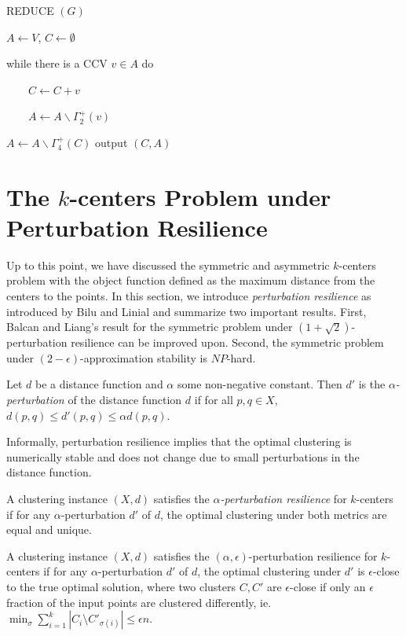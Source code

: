 \begin{algorithm}
\caption{REDUCE $(G)$}
$A \leftarrow V$, $C \leftarrow \emptyset$

while there is a CCV $v \in A$ do

\ \ \ \ $C \leftarrow C + v$

\ \ \ \ $A \leftarrow A \backslash \Gamma^+_2(v)$

$A \leftarrow A \backslash \Gamma^+_4(C)$
output $(C,A)$
\end{algorithm}

\section{The $k$-centers Problem under Perturbation Resilience}

Up to this point, we have discussed the symmetric and asymmetric $k$-centers problem with the object function defined as the maximum distance from the centers to the points. In this section, we introduce \emph{perturbation resilience} as introduced by Bilu and Linial and summarize two important results. First, Balcan and Liang's result for the symmetric problem under $(1+\sqrt2)$-perturbation resilience can be improved upon. Second, the symmetric problem under $(2-\epsilon)$-approximation stability is $NP$-hard.

\begin{definition}
Let $d$ be a distance function and $\alpha$ some non-negative constant. Then $d'$ is the \emph{$\alpha$-perturbation} of the distance function $d$ if for all $p,q\in X$, $d(p,q)\leq d'(p,q)\leq\alpha d(p,q)$.
\end{definition}

\begin{remark}
Informally, perturbation resilience implies that the optimal clustering is numerically stable and does not change due to small perturbations in the distance function.
\end{remark}

\begin{definition}
A clustering instance $(X,d)$ satisfies the \emph{$\alpha$-perturbation resilience} for $k$-centers if for any $\alpha$-perturbation $d'$ of $d$, the optimal clustering under both metrics are equal and unique.
\end{definition}

\begin{definition}
A clustering instance $(X,d)$ satisfies the $(\alpha,\epsilon)$-perturbation resilience for $k$-centers if for any $\alpha$-perturbation $d'$ of $d$, the optimal clustering under $d'$ is $\epsilon$-close to the true optimal solution, where two clusters $C,C'$ are $\epsilon$-close if only an $\epsilon$ fraction of the input points are clustered differently, ie. $\min_\sigma\sum_{i=1}^k|C_i\setminus C'_{\sigma(i)}|\leq\epsilon n$.
\end{definition}

